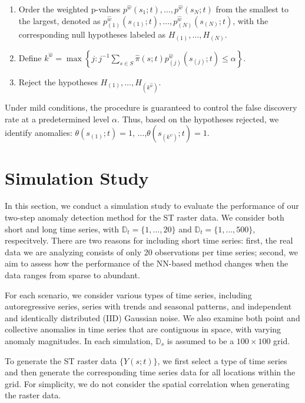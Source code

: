 \documentclass[11pt]{article}
\begin{document}
\begin{enumerate}
    \item Order the weighted p-values $p^{\hat{w}}(s_1;t), \ldots, p^{\hat{w}}(s_N;t)$ from the smallest to the largest, denoted as $p_{(1)}^{\hat{w}}(s_{(1)};t), \ldots, p_{(N)}^{\hat{w}}(s_{(N)};t)$, with the corresponding null hypotheses labeled as $H_{(1)}, \ldots, H_{(N)}$. 
    \item Define $k^{\hat{w}} = \max\left\{j : j^{-1}\sum_{s \in S} \hat{\pi}(s;t)p_{(j)}^{\hat{w}}(s_{(j)};t) \leq \alpha\right\}$.
    \item Reject the hypotheses $H_{(1)}, \ldots, H_{(k^{\hat{w}})}$.  
\end{enumerate}	

Under mild conditions, the procedure is guaranteed to control the false discovery rate at a predetermined level $\alpha$. Thus, based on the hypotheses rejected, we identify anomalies: $\theta(s_{(1)};t)=1$, $\ldots$,$\theta(s_{(k^{\psi})};t)=1$.





\section{Simulation Study}\label{sec: simulation}
In this section, we conduct a simulation study to evaluate the performance of our two-step anomaly detection method for the ST raster data. We consider both short and long time series, with $\mathbb{D}_t=\{1,\ldots,20\}$ and $\mathbb{D}_t=\{1,\ldots,500\}$, respecitvely. There are two reasons for including short time series: first, the  real data we are analyzing consists of only 20 observations per time series; second, we aim to assess how the performance of the NN-based method changes when the data ranges from sparse to abundant.

For each scenario, we consider various types of time series, including autoregressive series, series with trends and seasonal patterns, and independent and identically distributed (IID) Gaussian noise. We also examine both point and collective anomalies in time series that are contiguous in space, with varying anomaly magnitudes. In each simulation, $\mathbb{D}_s$ is assumed to be a $100\times 100$ grid. 

To generate the ST raster data $\{Y(s;t)\}$, we first select a type of time series and then generate the corresponding time series data for all locations within the grid. For simplicity, we do not consider the spatial correlation when generating the raster data. 
\end{document}
